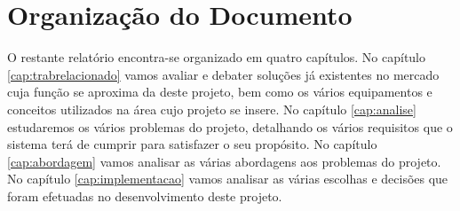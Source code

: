 \section{Organização do Documento} \label{sec12}
O restante relatório encontra-se organizado em quatro capítulos. No capítulo \ref{cap:trabrelacionado} vamos avaliar e debater soluções já existentes no mercado cuja função se aproxima da deste projeto, bem como os vários equipamentos e conceitos utilizados na área cujo projeto se insere. No capítulo \ref{cap:analise} estudaremos os vários problemas do projeto, detalhando os vários requisitos que o sistema terá de cumprir para satisfazer o seu propósito. No capítulo \ref{cap:abordagem} vamos analisar as várias abordagens aos problemas do projeto. No capítulo \ref{cap:implementacao} vamos analisar as várias escolhas e decisões que foram efetuadas no desenvolvimento deste projeto.
